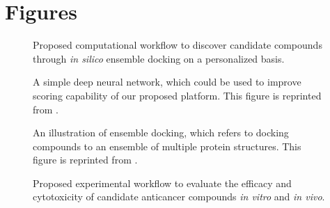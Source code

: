 \documentclass[a4paper,12pt]{article}
\begin{document}
\section*{Figures}

\begin{figure}[h!]
\centering
\caption{Proposed computational workflow to discover candidate compounds through \textit{in silico} ensemble docking on a personalized basis.}
\label{fig:ComputationalFlow}
\end{figure}

\begin{figure}[h!]
\centering
\caption{A simple deep neural network, which could be used to improve scoring capability of our proposed platform. This figure is reprinted from \citep{1810}.}
\label{fig:SimpleDNN}
\end{figure}

\begin{figure}[h!]
\centering
\caption{An illustration of ensemble docking, which refers to docking compounds to an ensemble of multiple protein structures. This figure is reprinted from \citep{1811}.}
\label{fig:EnsembleDocking}
\end{figure}

\begin{figure}[h!]
\centering
\caption{Proposed experimental workflow to evaluate the efficacy and cytotoxicity of candidate anticancer compounds \textit{in vitro} and \textit{in vivo}.}
\label{fig:ExperimentalFlow}
\end{figure}
\end{document}

